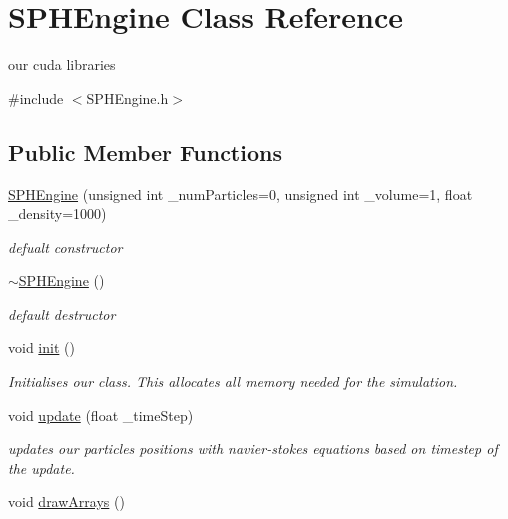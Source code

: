 \hypertarget{class_s_p_h_engine}{\section{S\-P\-H\-Engine Class Reference}
\label{class_s_p_h_engine}
}


our cuda libraries  




{\ttfamily \#include $<$S\-P\-H\-Engine.\-h$>$}

\subsection*{Public Member Functions}
\begin{DoxyCompactItemize}
\item 
\hyperlink{class_s_p_h_engine_a7ac2d6cd3692ce0c0521435384ad3869}{S\-P\-H\-Engine} (unsigned int \-\_\-num\-Particles=0, unsigned int \-\_\-volume=1, float \-\_\-density=1000)
\begin{DoxyCompactList}\small\item\em defualt constructor \end{DoxyCompactList}\item 
\hypertarget{class_s_p_h_engine_a0969407c141667c1147d409a0397257d}{\hyperlink{class_s_p_h_engine_a0969407c141667c1147d409a0397257d}{$\sim$\-S\-P\-H\-Engine} ()}\label{class_s_p_h_engine_a0969407c141667c1147d409a0397257d}

\begin{DoxyCompactList}\small\item\em default destructor \end{DoxyCompactList}\item 
\hypertarget{class_s_p_h_engine_a0df6d1b33d50afb152e2992de5af5700}{void \hyperlink{class_s_p_h_engine_a0df6d1b33d50afb152e2992de5af5700}{init} ()}\label{class_s_p_h_engine_a0df6d1b33d50afb152e2992de5af5700}

\begin{DoxyCompactList}\small\item\em Initialises our class. This allocates all memory needed for the simulation. \end{DoxyCompactList}\item 
void \hyperlink{class_s_p_h_engine_a1a17b5c04756850b68cf95b917019241}{update} (float \-\_\-time\-Step)
\begin{DoxyCompactList}\small\item\em updates our particles positions with navier-\/stokes equations based on timestep of the update. \end{DoxyCompactList}\item 
\hypertarget{class_s_p_h_engine_a91f224d67175615716059dba23c38a98}{void \hyperlink{class_s_p_h_engine_a91f224d67175615716059dba23c38a98}{draw\-Arrays} ()}\label{class_s_p_h_engine_a91f224d67175615716059dba23c38a98}


\end{DoxyCompactItemize}
